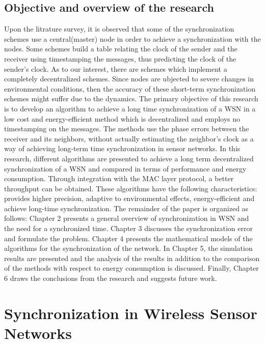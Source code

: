 \documentclass[a4paper,10pt]{report}
\begin{document}
\section{\textbf{Objective and overview of the research}}
\noindent Upon the litrature survey, it is observed that some of the synchronization schemes use a central(master) node in order to achieve a synchronization with the nodes. Some schemes build a table relating the clock of the sender and the receiver using timestamping the messages, thus predicting the clock of the sender's clock. As to our interest, there are schemes which implement a completely decentralized schemes. Since nodes are ubjected to severe changes in environmental conditions, then the accuracy of these short-term synchronization schemes might suffer due to the dynamics.
\newline
The primary objective of this research is to develop an algorithm to achieve a long time synchronization of a WSN in a low cost and
energy-efficient method which is decentralized and employs no timestamping on the messages. The methods use the phase errors
between the receiver and its neighbors, without actually estimating the neighbor's clock as a way of achieving long-term time synchronization in sensor networks. In this research, different algorithms are presented to achieve a long term decentralized synchronization of a WSN and compared in terms of performance and energy consumption. Through integration with the MAC layer protocol, a better throughput can be obtained. These algorithms have the following characteristics: provides higher precision, adaptive to environmental effects, energy-efficient and achieve long-time synchronization. 
\newline The remainder of the paper is organized as follows:  Chapter 2 presents a general overview of synchronization in WSN and the need
for a synchronized time. Chapter 3 discusses the synchronization error and formulate the problem. Chapter 4 presents the
mathematical models of the algorithms for the synchronization of the network. In Chapter 5, the simulation results are presented and the
analysis of the results in addition to the comparison of the methods with respect to energy consumption is discussed. Finally, Chapter 6
draws the conclusions from the research and suggests future work. 
\chapter{\textbf{Synchronization in Wireless Sensor Networks}}
\end{document}

